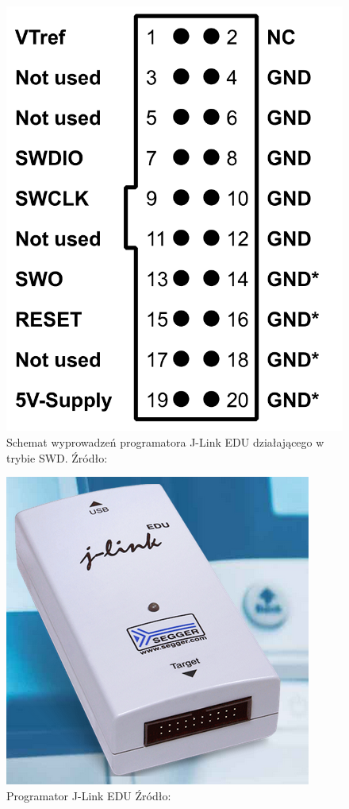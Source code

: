 \begin{figure}[H]
\centering
\includegraphics[width=0.35\paperwidth]{images/J-Link_pinout_SWD.png}
\caption{Schemat wyprowadzeń programatora J-Link EDU działającego w trybie SWD. Źródło:\cite{J-Link_pinout_SWD}}
\label{J_Link_SWD_pinout}
\end{figure}

   \begin{figure}[H]
    \centering
    \includegraphics[width=0.45\paperwidth]{images/J-Link_EDU.png}
    \caption{Programator J-Link EDU Źródło:\cite{J-Link_EDU_photo}}
    \label{J_Link_photo}
\end{figure}

  


 


